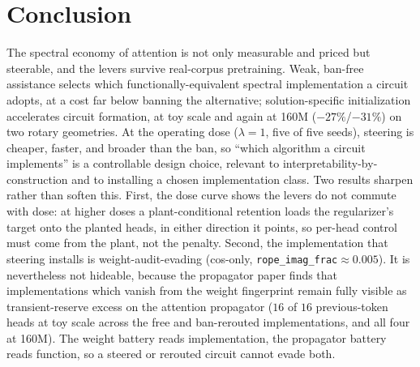 \documentclass[11pt]{article}
\newcommand{\rif}{\texttt{rope\_imag\_frac}\xspace}
\begin{document}
\section{Conclusion}
The spectral economy of attention is not only measurable and priced \citep{li2026fingerprint,li2026pseudospectra} but steerable, and the
levers survive real-corpus pretraining. Weak, ban-free assistance selects which functionally-equivalent spectral
implementation a circuit adopts, at a cost far below banning the alternative; solution-specific initialization
accelerates circuit formation, at toy scale and again at 160M ($-27\%$/$-31\%$) on two rotary geometries. At the
operating dose ($\lambda{=}1$, five of five seeds), steering is cheaper, faster, and broader than the ban, so
``which algorithm a circuit implements'' is a controllable design choice, relevant to
interpretability-by-construction and to installing a chosen implementation class. Two results sharpen rather than
soften this. First, the dose curve shows the levers do not commute with dose: at higher doses a plant-conditional
retention loads the regularizer's target onto the planted heads, in either direction it points, so per-head
control must come from the plant, not the penalty. Second, the implementation that steering installs is
weight-audit-evading (cos-only, \rif${\approx}0.005$). It is nevertheless not hideable, because the propagator
paper \citep{li2026pseudospectra} finds that implementations which vanish from the weight
fingerprint remain fully visible as transient-reserve excess on the attention propagator ($16$ of $16$ previous-token heads at toy scale across the
free and ban-rerouted implementations, and all four at 160M). The weight battery reads implementation, the
propagator battery reads function, so a steered or rerouted circuit cannot evade both.
\end{document}
